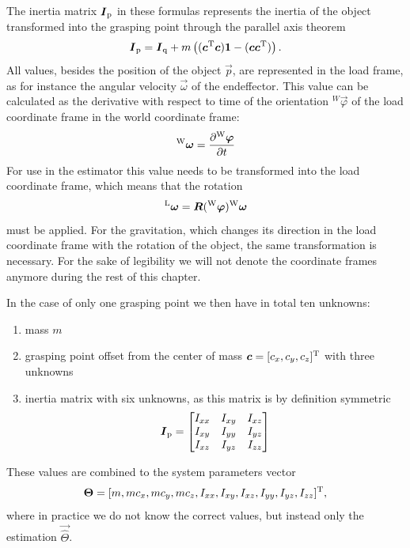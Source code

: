 The inertia matrix $\boldsymbol{I}_{\mathrm{p}}$ in these formulas represents the inertia of the object transformed into the grasping point through the parallel axis theorem
\begin{equation}
	\boldsymbol{I}_{\mathrm{p}} = \boldsymbol{I}_{\mathrm{q}} + m \left( (\boldsymbol{c}^{\mathrm{T}} \boldsymbol{c}) \boldsymbol{1} - (\boldsymbol{c} \boldsymbol{c}^{\mathrm{T}}) \right).
\end{equation}
All values, besides the position of the object $\vec p$, are represented in the load frame, as for instance the angular velocity $\vec \omega$ of the endeffector. This value can be calculated as the derivative with respect to time of the orientation $^W\vec{\varphi}$ of the load coordinate frame in the world coordinate frame:
\begin{equation}
	{^{\mathrm{W}}}\boldsymbol{\omega} = \frac{\partial {^{\mathrm{W}}}\boldsymbol{\varphi}}{\partial t}
\end{equation}
For use in the estimator this value needs to be transformed into the load coordinate frame, which means that the rotation
\begin{equation}
	^{\mathrm{L}}\boldsymbol{\omega} = \boldsymbol{R}({^{\mathrm{W}}}\boldsymbol{\varphi}) {^{\mathrm{W}}}\boldsymbol{\omega}
\end{equation}
must be applied. For the gravitation, which changes its direction in the load coordinate frame with the rotation of the object, the same transformation is necessary. For the sake of legibility we will not denote the coordinate frames anymore during the rest of this chapter.

In the case of only one grasping point we then have in total ten unknowns:
\begin{enumerate}
	\item mass $m$
	\item grasping point offset from the center of mass $\boldsymbol{c} = [c_x, c_y, c_z]^{\mathrm{T}}$ with three unknowns
	\item inertia matrix with six unknowns, as this matrix is by definition symmetric
	\begin{equation}
		\boldsymbol{I}_{\mathrm{p}} = 
		\begin{bmatrix}	
			I_{xx}	& I_{xy}	& I_{xz} \\
			I_{xy}	& I_{yy}	& I_{yz} \\
			I_{xz}	& I_{yz}	& I_{zz}
		\end{bmatrix}
	\end{equation}
\end{enumerate}

These values are combined to the system parameters vector
\begin{equation}
	\boldsymbol{\Theta} = [m, m c_x, m c_y, m c_z, I_{xx}, I_{xy}, I_{xz}, I_{yy},I_{yz}, I_{zz}]^{\mathrm{T}},
\end{equation}
where in practice we do not know the correct values, but instead only the estimation $\vec{\hat \Theta}$.

